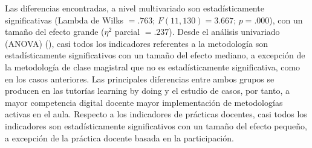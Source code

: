\documentclass[spanish]{textolivre}
\begin{document}
Las diferencias encontradas, a nivel multivariado son estadísticamente significativas (Lambda de Wilks $=.763$; $F(11, 130)=3.667$; $p=.000$), con un tamaño del efecto grande ($\eta^2$ parcial $=.237$). Desde el análisis univariado (ANOVA) (), casi todos los indicadores referentes a la metodología son estadísticamente significativos con un tamaño del efecto mediano, a excepción de la metodología de clase magistral que no es estadísticamente significativa, como en los casos anteriores. Las principales diferencias entre ambos grupos se producen en las tutorías learning by doing y el estudio de casos, por tanto, a mayor competencia digital docente mayor implementación de metodologías activas en el aula. Respecto a los indicadores de prácticas docentes, casi todos los indicadores son estadísticamente significativos con un tamaño del efecto pequeño, a excepción de la práctica docente basada en la participación.
\end{document}
